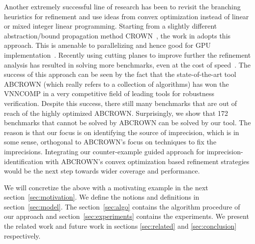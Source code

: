 Another extremely successful line of research has been to revisit the branching heuristics for refinement and use ideas from convex optimization instead of linear or mixed integer linear programming. Starting from a slightly different abstraction/bound propagation method CROWN~\cite{crown}, the work in \cite{betacrown} adopts this approach. This is amenable to parallelizing and hence good for GPU implementation~\cite{gpucrown}. Recently using cutting planes to improve further the refinement analysis has resulted in solving more benchmarks, even at the cost of speed~\cite{cutting-planes}. The success of this approach can be seen by the fact that the state-of-the-art tool ABCROWN (which really refers to a collection of algorithms) has won the VNNCOMP in a very competitive field of leading tools for robustness verification. Despite this success, there still many benchmarks that are out of reach of the highly optimized ABCROWN. Surprisingly, we show that 172 benchmarks that cannot be solved by ABCROWN can be solved by our tool. The reason is that our focus is on identifying the source of imprecision, which is in some sense, orthogonal to ABCROWN's focus on techniques to fix the imprecisions. Integrating our counter-example guided approach for imprecision-identification with ABCROWN's convex optimization based refinement strategies would be the next step towards wider coverage and performance. %





We will concretize the above with a motivating example in the next section~\ref{sec:motivation}.  We define the notions and definitions in section~\ref{sec:model}. The section~\ref{sec:algo} contains the 
algorithm procedure of our approach and section~\ref{sec:experiments} contains the experiments. 
We present the related work and future work in sections \ref{sec:related} and \ref{sec:conclusion} respectively. 




